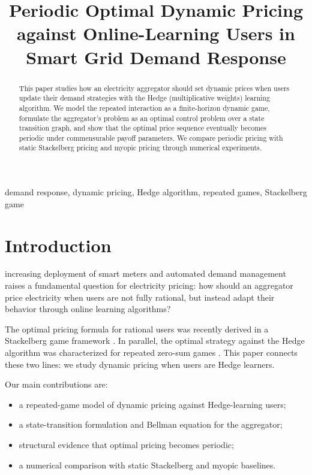 \documentclass[conference]{IEEEtran}
\title{Periodic Optimal Dynamic Pricing against Online-Learning Users in Smart Grid Demand Response}
\author{\IEEEauthorblockN{Author Name}
\IEEEauthorblockA{School of \ldots\\
University\\City, Country\\email@example.com}}
\begin{document}
\maketitle

\begin{abstract}
This paper studies how an electricity aggregator should set dynamic prices when users update their demand strategies with the Hedge (multiplicative weights) learning algorithm. We model the repeated interaction as a finite-horizon dynamic game, formulate the aggregator's problem as an optimal control problem over a state transition graph, and show that the optimal price sequence eventually becomes periodic under commensurable payoff parameters. We compare periodic pricing with static Stackelberg pricing and myopic pricing through numerical experiments.
\end{abstract}

\begin{IEEEkeywords}
demand response, dynamic pricing, Hedge algorithm, repeated games, Stackelberg game
\end{IEEEkeywords}

\section{Introduction}
 increasing deployment of smart meters and automated demand management raises a fundamental question for electricity pricing: how should an aggregator price electricity when users are not fully rational, but instead adapt their behavior through online learning algorithms?

The optimal pricing formula for rational users was recently derived in a Stackelberg game framework \cite{mu2024pricing}. In parallel, the optimal strategy against the Hedge algorithm was characterized for repeated zero-sum games \cite{guo2023optimal}. This paper connects these two lines: we study dynamic pricing when users are Hedge learners.

Our main contributions are:
\begin{itemize}
    \item a repeated-game model of dynamic pricing against Hedge-learning users;
    \item a state-transition formulation and Bellman equation for the aggregator;
    \item structural evidence that optimal pricing becomes periodic;
    \item a numerical comparison with static Stackelberg and myopic baselines.
\end{itemize}
\end{document}
